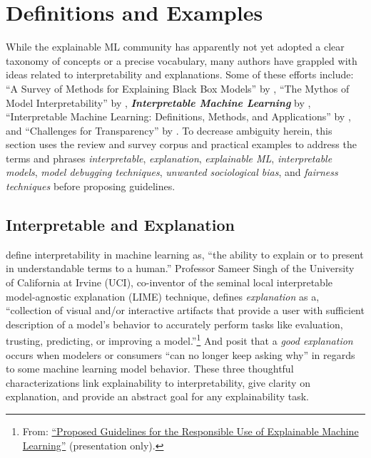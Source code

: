\documentclass{article}
\begin{document}
\section{Definitions and Examples} \label{sec:intro}

While the explainable ML community has apparently not yet adopted a clear taxonomy of concepts or a precise vocabulary, many authors have grappled with ideas related to interpretability and explanations. Some of these efforts include: ``A Survey of Methods for Explaining Black Box Models''  by \citet{guidotti2018survey}, ``The Mythos of Model Interpretability'' by \citet{lipton1}, \textit{\textbf{Interpretable Machine Learning}} by \citet{molnar}, ``Interpretable Machine Learning: Definitions,
Methods, and Applications'' by \citet{murdoch2019interpretable}, and ``Challenges for Transparency''  by \citet{weller2017challenges}. To decrease ambiguity herein, this section uses the review and survey corpus and practical examples to address the terms and phrases \textit{interpretable}, \textit{explanation}, \textit{explainable ML}, \textit{interpretable models}, \textit{model debugging techniques}, \textit{unwanted sociological bias}, and \textit{fairness techniques} before proposing guidelines.

\subsection{Interpretable and Explanation}

\citet{been_kim1} define interpretability in machine learning as, ``the ability to explain or to present in understandable terms to a human.'' Professor Sameer Singh of the University of California at Irvine (UCI), co-inventor of the seminal local interpretable model-agnostic explanation (LIME) technique, defines \textit{explanation} as a, ``collection of visual and/or interactive artifacts that provide a user with sufficient description of a model's behavior to accurately perform tasks like evaluation, trusting, predicting, or improving a model.''\footnote{\scriptsize{From: \href{https://github.com/jphall663/kdd_2019}{``Proposed Guidelines for the Responsible Use of Explainable Machine Learning''} (presentation only).}} And \citet{gilpin2018explaining} posit that a \textit{good explanation} occurs when modelers or consumers ``can no longer keep asking why'' in regards to some machine learning model behavior. These three thoughtful characterizations link explainability to interpretability, give clarity on explanation, and provide an abstract goal for any explainability task.
\end{document}
